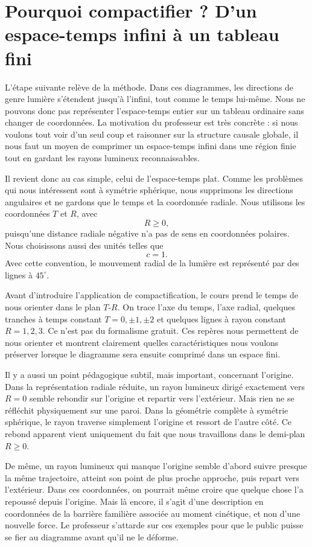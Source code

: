 \section{Pourquoi compactifier ? D’un espace-temps infini à un tableau fini}

L’étape suivante relève de la méthode. Dans ces diagrammes, les directions de genre lumière s’étendent jusqu’à l’infini, tout comme le temps lui-même. Nous ne pouvons donc pas représenter l’espace-temps entier sur un tableau ordinaire sans changer de coordonnées. La motivation du professeur est très concrète : si nous voulons tout voir d’un seul coup et raisonner sur la structure causale globale, il nous faut un moyen de comprimer un espace-temps infini dans une région finie tout en gardant les rayons lumineux reconnaissables.

Il revient donc au cas simple, celui de l’espace-temps plat. Comme les problèmes qui nous intéressent sont à symétrie sphérique, nous supprimons les directions angulaires et ne gardons que le temps et la coordonnée radiale. Nous utilisons les coordonnées \(T\) et \(R\), avec
\[
R\ge 0,
\]
puisqu’une distance radiale négative n’a pas de sens en coordonnées polaires. Nous choisissons aussi des unités telles que
\[
c=1.
\]
Avec cette convention, le mouvement radial de la lumière est représenté par des lignes à \(45^\circ\).

Avant d’introduire l’application de compactification, le cours prend le temps de nous orienter dans le plan \(T\)-\(R\). On trace l’axe du temps, l’axe radial, quelques tranches à temps constant \(T=0,\pm1,\pm2\) et quelques lignes à rayon constant \(R=1,2,3\). Ce n’est pas du formalisme gratuit. Ces repères nous permettent de nous orienter et montrent clairement quelles caractéristiques nous voulons préserver lorsque le diagramme sera ensuite comprimé dans un espace fini.

Il y a aussi un point pédagogique subtil, mais important, concernant l’origine. Dans la représentation radiale réduite, un rayon lumineux dirigé exactement vers \(R=0\) semble rebondir sur l’origine et repartir vers l’extérieur. Mais rien ne se réfléchit physiquement sur une paroi. Dans la géométrie complète à symétrie sphérique, le rayon traverse simplement l’origine et ressort de l’autre côté. Ce rebond apparent vient uniquement du fait que nous travaillons dans le demi-plan \(R\ge 0\).

De même, un rayon lumineux qui manque l’origine semble d’abord suivre presque la même trajectoire, atteint son point de plus proche approche, puis repart vers l’extérieur. Dans ces coordonnées, on pourrait même croire que quelque chose l’a repoussé depuis l’origine. Mais là encore, il s’agit d’une description en coordonnées de la barrière familière associée au moment cinétique, et non d’une nouvelle force. Le professeur s’attarde sur ces exemples pour que le public puisse se fier au diagramme avant qu’il ne le déforme.

